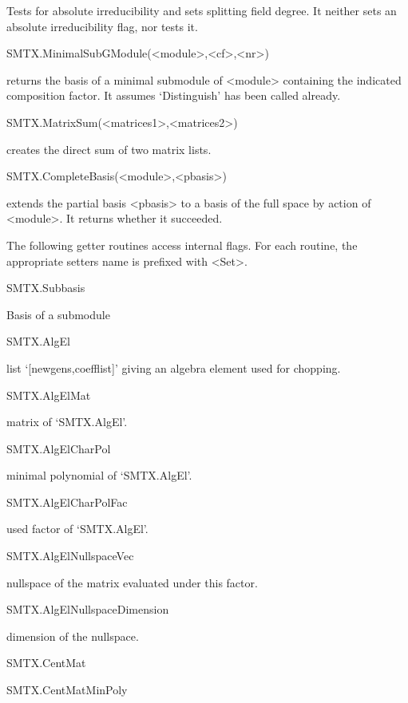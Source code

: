 Tests for absolute irreducibility and sets splitting field degree. It
neither sets an absolute irreducibility flag, nor tests it.

\>SMTX.MinimalSubGModule(<module>,<cf>,<nr>)

returns the basis of a minimal submodule of <module> containing the
indicated composition factor. It assumes `Distinguish' has been called
already.

\>SMTX.MatrixSum(<matrices1>,<matrices2>)

creates the direct sum of two matrix lists.

\>SMTX.CompleteBasis(<module>,<pbasis>)

extends the partial basis <pbasis> to a basis of the full space
by action of <module>. It returns whether it succeeded.


The following getter routines access internal flags. For each routine, the
appropriate setters name is prefixed with <Set>.

\>SMTX.Subbasis

Basis of a submodule

\>SMTX.AlgEl

list `[newgens,coefflist]' giving an algebra element used for chopping.

\>SMTX.AlgElMat

matrix of `SMTX.AlgEl'.

\>SMTX.AlgElCharPol

minimal polynomial of `SMTX.AlgEl'.

\>SMTX.AlgElCharPolFac

used factor of `SMTX.AlgEl'.

\>SMTX.AlgElNullspaceVec

nullspace of the matrix evaluated under this factor.

\>SMTX.AlgElNullspaceDimension

dimension of the nullspace.

\>SMTX.CentMat


\>SMTX.CentMatMinPoly


